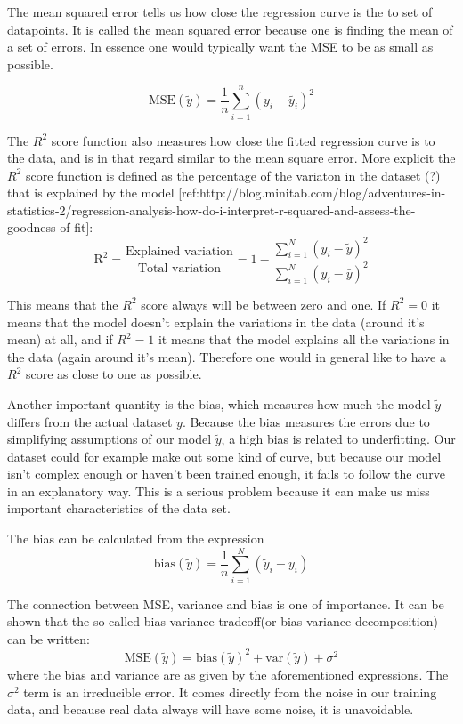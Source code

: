 \documentclass[a4paper,12pt]{article}
\begin{document}
The mean squared error tells us how close the regression curve is the to set of datapoints. It is called the mean squared error because one is finding the mean of a set of errors. In essence one would typically want the MSE to be as small as possible.

\begin{equation}
\text{MSE}(\tilde{y})=\frac{1}{n}\sum_{i=1}^n(y_i-\tilde{y_i})^2
\end{equation}

The $R^2$ score function also measures how close the fitted regression curve is to the data, and is in that regard similar to the mean square error. More explicit the $R^2$ score function is defined as the percentage of the variaton in the dataset (?) that is explained by the model [ref:http://blog.minitab.com/blog/adventures-in-statistics-2/regression-analysis-how-do-i-interpret-r-squared-and-assess-the-goodness-of-fit]:
\begin{equation}
\text{R}^2=\frac{\text{Explained variation}}{\text{Total variation}} = 1-\frac{\sum_{i=1}^N(y_i-\tilde{y})^2}{\sum_{i=1}^N(y_i-\bar{y})^2}
\end{equation}

This means that the $R^2$ score always will be between zero and one. If $R^2 = 0$ it means that the model doesn't explain the variations in the data (around it's mean) at all, and if $R^2 = 1$ it means that the model explains all the variations in the data (again around it's mean). Therefore one would in general like to have a $R^2$ score as close to one as possible.\newline

Another important quantity is the bias, which measures how much the model $\tilde{y}$ differs from the actual dataset $y$. Because the bias measures the errors due to simplifying assumptions of our model $\tilde{y}$, a high bias is related to underfitting. Our dataset could for example make out some kind of curve, but because our model isn't complex enough or haven't been trained enough, it fails to follow the curve in an explanatory way. This is a serious problem because it can make us miss important characteristics of the data set.

The bias can be calculated from the expression
\begin{equation}
\text{bias}(\tilde{y})=\frac{1}{n}\sum_{i=1}^N(\tilde{y}_i - y_i)
\end{equation}

The connection between MSE, variance and bias is one of importance. It can be shown that the so-called bias-variance tradeoff(or bias-variance decomposition) can be written:
\begin{equation}
\text{MSE}(\tilde{y})=\text{bias}(\tilde{y})^2 + \text{var}(\tilde{y}) +\sigma^2
\end{equation}
where the bias and variance are as given by the aforementioned expressions. The $\sigma^2$ term is an irreducible error. It comes directly from the noise in our training data, and because real data always will have some noise, it is unavoidable.\newline
\end{document}
